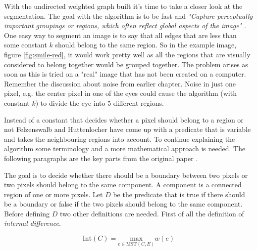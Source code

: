 With the undirected weighted graph built it's time to take a closer look at the
segmentation. The goal with the algorithm is to be fast and {\em "Capture perceptually
important groupings or regions, which often reflect global aspects of the image"} \cite{felzenszwalb2004}.
One easy way to segment an image is to say that all edges that are less than some
constant \(k\) should belong to the same region. So in the example image, figure \ref{fig:smile-red},
it would work pretty well as all the regions that are visually considered to belong
together would be grouped together. The problem arises as soon as this is tried
on a "real" image that has not been created on a computer. Remember the discussion
about noise from earlier chapter. Noise in just one pixel, e.g. the center
pixel in one of the eyes could cause the algorithm (with constant \(k\)) to divide
the eye into 5 different regions.

Instead of a constant that decides whether a pixel should belong to a region or
not Felzenswalb and Huttenlocher have come up with a predicate that is variable
and takes the neighbouring regions into account. To continue explaining the
algorithm some terminology and a more mathematical approach is needed. The following
paragraphs are the key parts from the original paper \cite[ch. 3.1 Pairwise
Region Comparison Predicate]{felzenszwalb2004}.

The goal is to decide whether there should be a boundary between two pixels or
two pixels should belong to the same component. A component is a connected region of one
or more pixels. Let \(D\) be the predicate that is true if there should be a
boundary or false if the two pixels should belong to the same component. Before
defining \(D\) two other definitions are needed. First of all the definition
of {\em internal difference}.

\begin{equation}
    \label{eq:internalDifference}
    \text{Int}(C) = \underset{e \in \text{MST}(C,E)}{\text{max}} w(e)
\end{equation}

